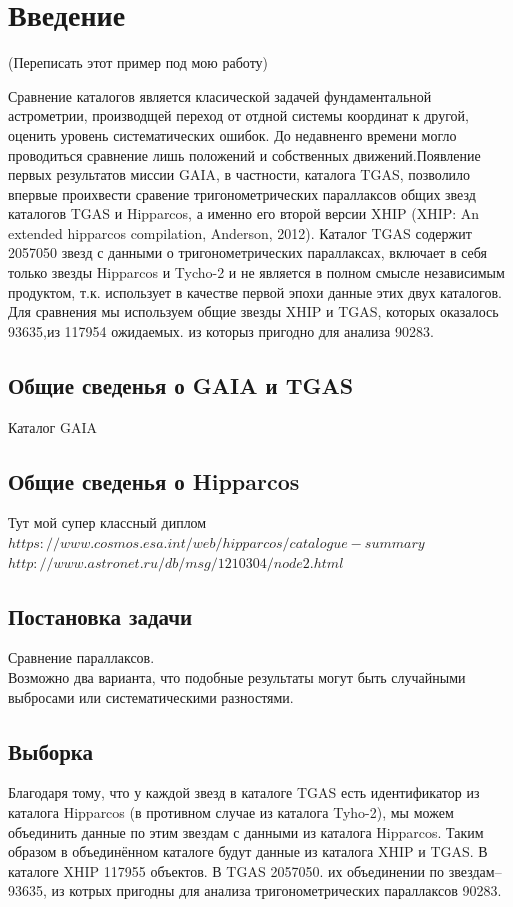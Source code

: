 \documentclass[14pt]{article} %
\begin{document}
 
\section{Введение}\label{introduction}

(Переписать этот пример под мою работу)


Сравнение каталогов является класической задачей фундаментальной\\ астрометрии, производщей переход от отдной системы координат к другой, оценить уровень систематических ошибок. До недавненго времени могло проводиться сравнение лишь положений и собственных движений.Появление первых результатов миссии GAIA, в частности, каталога TGAS, позволило впервые проихвести сравение тригонометрических параллаксов общих звезд каталогов TGAS и  Hipparcos, а именно его второй версии XHIP (XHIP: An extended hipparcos compilation, Anderson, 2012). Каталог TGAS содержит 2057050 звезд с данными о тригонометрических параллаксах, включает в себя только звезды Hipparcos и Tycho-2  и не является в полном смысле независимым продуктом, т.к. использует в качестве первой эпохи данные этих двух каталогов. Для сравнения мы используем общие звезды XHIP  и TGAS, которых оказалось 93635,из 117954 ожидаемых. из которыз пригодно для анализа 90283.

\subsection{Общие сведенья о GAIA и TGAS}\label{sub:smthgaia}
Каталог GAIA
		
\subsection{Общие сведенья о Hipparcos}\label{sub:smthhip}
Тут мой супер классный диплом
$https://www.cosmos.esa.int/web/hipparcos/catalogue-summary$
$http://www.astronet.ru/db/msg/1210304/node2.html$

\subsection{Постановка задачи}\label{sub:smthzd}
	Сравнение параллаксов.\\
Возможно два варианта, что подобные результаты могут быть случайными выбросами или систематическими разностями.

\subsection{Выборка}\label{sub:smthzd}
Благодаря тому, что у каждой звезд в каталоге TGAS есть идентификатор из каталога Hipparcos (в противном случае из каталога Tyho-2), мы можем объединить данные по этим звездам с данными из каталога Hipparcos. Таким образом в объединённом каталоге будут данные из каталога XHIP и TGAS. В каталоге XHIP 117955 объектов. В TGAS 2057050. их объединении по звездам-- 93635, из котрых пригодны для анализа тригонометрических параллаксов  90283.
\end{document}
